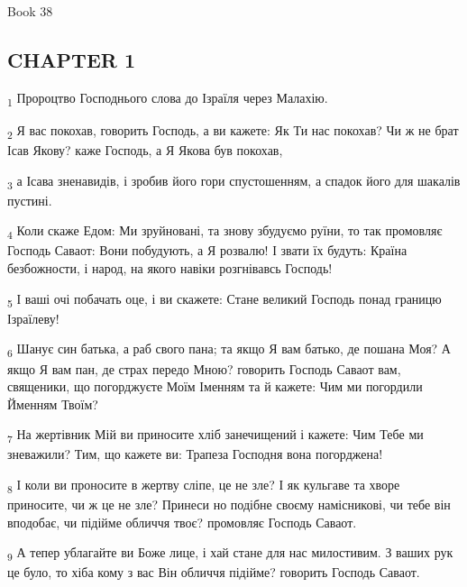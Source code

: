 Book 38
\subsection{CHAPTER 1}
\begin{tcolorbox}
\textsubscript{1} Пророцтво Господнього слова до Ізраїля через Малахію.
\end{tcolorbox}
\begin{tcolorbox}
\textsubscript{2} Я вас покохав, говорить Господь, а ви кажете: Як Ти нас покохав? Чи ж не брат Ісав Якову? каже Господь, а Я Якова був покохав,
\end{tcolorbox}
\begin{tcolorbox}
\textsubscript{3} а Ісава зненавидів, і зробив його гори спустошенням, а спадок його для шакалів пустині.
\end{tcolorbox}
\begin{tcolorbox}
\textsubscript{4} Коли скаже Едом: Ми зруйновані, та знову збудуємо руїни, то так промовляє Господь Саваот: Вони побудують, а Я розвалю! І звати їх будуть: Країна безбожности, і народ, на якого навіки розгнівавсь Господь!
\end{tcolorbox}
\begin{tcolorbox}
\textsubscript{5} І ваші очі побачать оце, і ви скажете: Стане великий Господь понад границю Ізраїлеву!
\end{tcolorbox}
\begin{tcolorbox}
\textsubscript{6} Шанує син батька, а раб свого пана; та якщо Я вам батько, де пошана Моя? А якщо Я вам пан, де страх передо Мною? говорить Господь Саваот вам, священики, що погорджуєте Моїм Іменням та й кажете: Чим ми погордили Йменням Твоїм?
\end{tcolorbox}
\begin{tcolorbox}
\textsubscript{7} На жертівник Мій ви приносите хліб занечищений і кажете: Чим Тебе ми зневажили? Тим, що кажете ви: Трапеза Господня вона погорджена!
\end{tcolorbox}
\begin{tcolorbox}
\textsubscript{8} І коли ви проносите в жертву сліпе, це не зле? І як кульгаве та хворе приносите, чи ж це не зле? Принеси но подібне своєму намісникові, чи тебе він вподобає, чи підійме обличчя твоє? промовляє Господь Саваот.
\end{tcolorbox}
\begin{tcolorbox}
\textsubscript{9} А тепер ублагайте ви Боже лице, і хай стане для нас милостивим. З ваших рук це було, то хіба кому з вас Він обличчя підійме? говорить Господь Саваот.
\end{tcolorbox}
